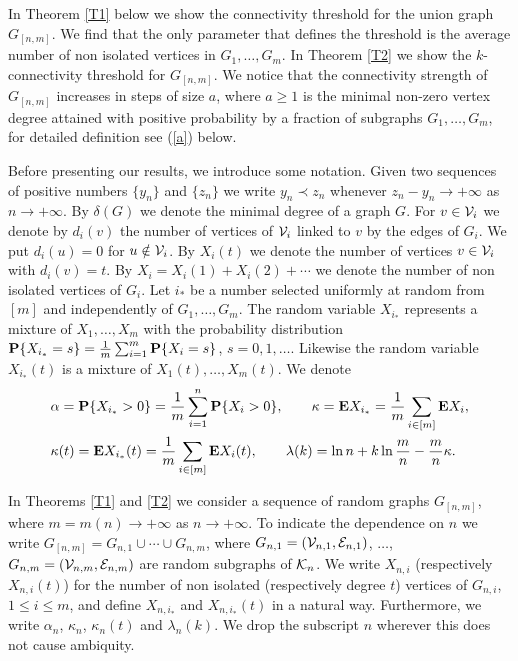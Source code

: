 \documentclass[11pt, a4paper]{article}
\newcommand{\E}{{\bf{E}}}
\newcommand{\PP}{{\bf{P}}}
\begin{document}
In Theorem \ref{T1} below we show the connectivity 
threshold for the union graph $G_{[n,m]}$. We find that 
the only parameter that defines the threshold is the 
average number of non isolated vertices
in $G_1,\dots, G_m$. 
In Theorem \ref{T2} we show the $k$-connectivity threshold for $G_{[n,m]}$. We notice that the connectivity strength of
$G_{[n,m]}$ increases in steps of size $a$, where 
$a\ge 1$ is the minimal non-zero vertex degree
attained with positive probability by a fraction of subgraphs $G_1,\dots, G_m$, for detailed definition see (\ref{a}) below. 


Before presenting our results, we introduce some notation.
%
Given two sequences of positive 
numbers $\{y_n\}$ and $\{z_n\}$ we write
$y_n\prec z_n$ whenever $z_n-y_n\to+\infty$ as $n\to+\infty$.
By $\delta(G)$ we denote the minimal degree of a graph $G$.
%
For $v\in{\cal V}_i$ we denote by $d_i(v)$ the number of vertices of ${\cal V}_i$ linked to $v$ by the edges of $G_i$. We put $d_i(u)=0$ for $u\notin {\cal V}_i$.
By $X_i(t)$ we denote the number of vertices $
v\in{\cal V}_i$ with $d_i(v)=t$. 
By $X_i=X_i(1)+X_i(2)+\cdots$ we denote the number of non isolated vertices of $G_i$. 
Let $i_*$ be a number selected  uniformly at random from
$[m]$ and independently of $G_{1},\dots, G_{m}$. 
The random variable  $X_{i_*}$ represents a mixture of $X_1,\dots, X_m$ with the probability distribution
$\PP\{X_{i_*}=s\}=\frac{1}{m}\sum_{i=1}^m\PP\{X_{i}=s\}$, $s=0,1,\dots$. Likewise the random variable $X_{i_*}(t)$ is a mixture of $X_1(t),\dots, X_m(t)$.
We denote
\begin{align*}
&
\alpha
=
\PP\{X_{i_*}>0\}
=
\frac{1}{m}\sum_{i=1}^n\PP\{X_{i}>0\},
\qquad
\kappa=\E X_{i_*}
=\frac{1}{m}\sum_{i\in[m]}\E X_{i},
\\
&
\kappa(t)=\E X_{i_*}(t)
=\frac{1}{m}\sum_{i\in[m]}\E X_{i}(t),
\qquad
\lambda(k)=\ln n+k\ln\frac{m}{n}-\frac{m}{n}\kappa.
\end{align*}







\noindent In Theorems \ref{T1}  and \ref{T2}  we consider a sequence of random graphs $G_{[n,m]}$, where $m=m(n)\to+\infty$ as $n\to+\infty$. To indicate the dependence on $n$ we 
write
$G_{[n,m]}=G_{n,1}\cup\cdots\cup G_{n,m}$, 
where $G_{n,1}=({\cal V}_{n,1},{\cal E}_{n,1})$, $\dots$, 
$G_{n,m}=({\cal V}_{n,m},{\cal E}_{n,m})$ are random 
subgraphs of ${\cal K}_n$. We write $X_{n,i}$ 
(respectively $X_{n,i}(t)$)  for the number of non 
isolated (respectively degree $t$) vertices of $G_{n,i}$, 
$1\le i\le m$, and  define $X_{n,i_*}$  and 
$X_{n,i_*}(t)$ in a natural way. Furthermore, we write 
$\alpha_n$, $\kappa_n$, $\kappa_n(t)$ and $\lambda_n(k)$. We drop the subscript $n$ wherever this does not cause  ambiquity.
\end{document}
